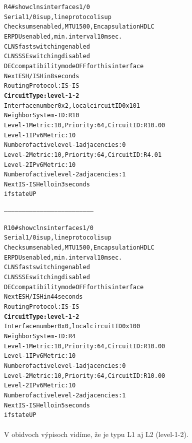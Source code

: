 \documentclass[12pt,twoside,a4paper]{report}
\begin{document}
\noindent
{\selectfont
\begin{small}
\begin{alltt}
R4#show clns interface s1/0
Serial1/0 is up, line protocol is up
  Checksums enabled, MTU 1500, Encapsulation HDLC
  ERPDUs enabled, min. interval 10 msec.
  CLNS fast switching enabled
  CLNS SSE switching disabled
  DEC compatibility mode OFF for this interface
  Next ESH/ISH in 8 seconds
  Routing Protocol: IS-IS
    \textbf{Circuit Type: level-1-2}
    Interface number 0x2, local circuit ID 0x101
    Neighbor System-ID: R10
    Level-1 Metric: 10, Priority: 64, Circuit ID: R10.00
    Level-1 IPv6 Metric: 10
    Number of active level-1 adjacencies: 0
    Level-2 Metric: 10, Priority: 64, Circuit ID: R4.01
    Level-2 IPv6 Metric: 10
    Number of active level-2 adjacencies: 1
    Next IS-IS Hello in 3 seconds
    if state UP


--------------------------------------------------------------------------


R10#show clns interface s1/0
Serial1/0 is up, line protocol is up
  Checksums enabled, MTU 1500, Encapsulation HDLC
  ERPDUs enabled, min. interval 10 msec.
  CLNS fast switching enabled
  CLNS SSE switching disabled
  DEC compatibility mode OFF for this interface
  Next ESH/ISH in 44 seconds
  Routing Protocol: IS-IS
    \textbf{Circuit Type: level-1-2}
    Interface number 0x0, local circuit ID 0x100
    Neighbor System-ID: R4
    Level-1 Metric: 10, Priority: 64, Circuit ID: R10.00
    Level-1 IPv6 Metric: 10
    Number of active level-1 adjacencies: 0
    Level-2 Metric: 10, Priority: 64, Circuit ID: R10.00
    Level-2 IPv6 Metric: 10
    Number of active level-2 adjacencies: 1
    Next IS-IS Hello in 5 seconds
    if state UP
\end{alltt}
\end{small}
}

\paragraph{}
V obidvoch výpisoch vidíme, že  je typu L1 aj L2 (level-1-2).
\end{document}
